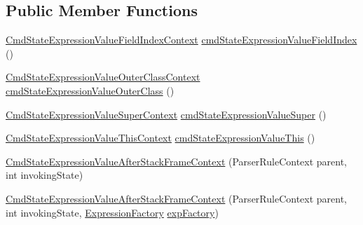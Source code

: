 \subsection*{Public Member Functions}
\begin{DoxyCompactItemize}
\item 
\hyperlink{classgov_1_1nasa_1_1jpf_1_1inspector_1_1server_1_1expression_1_1parser_1_1_expression_grammar_pa31d705710a4d9acddfdd67c37ac04c8a}{Cmd\+State\+Expression\+Value\+Field\+Index\+Context} \hyperlink{classgov_1_1nasa_1_1jpf_1_1inspector_1_1server_1_1expression_1_1parser_1_1_expression_grammar_pa89116a9ed8dad2a185081bb1175595f7_a6fb01dad45076170a7a324dc9d04ac2c}{cmd\+State\+Expression\+Value\+Field\+Index} ()
\item 
\hyperlink{classgov_1_1nasa_1_1jpf_1_1inspector_1_1server_1_1expression_1_1parser_1_1_expression_grammar_paa97aac802c11881ff9166c765f4fc61a}{Cmd\+State\+Expression\+Value\+Outer\+Class\+Context} \hyperlink{classgov_1_1nasa_1_1jpf_1_1inspector_1_1server_1_1expression_1_1parser_1_1_expression_grammar_pa89116a9ed8dad2a185081bb1175595f7_a0d332db4fc94bf762c9e8b290aa622e8}{cmd\+State\+Expression\+Value\+Outer\+Class} ()
\item 
\hyperlink{classgov_1_1nasa_1_1jpf_1_1inspector_1_1server_1_1expression_1_1parser_1_1_expression_grammar_pa66c003646cac4c60d53e10c6587465ef}{Cmd\+State\+Expression\+Value\+Super\+Context} \hyperlink{classgov_1_1nasa_1_1jpf_1_1inspector_1_1server_1_1expression_1_1parser_1_1_expression_grammar_pa89116a9ed8dad2a185081bb1175595f7_a90048ce6d26a1c6f31cd873b658d9d51}{cmd\+State\+Expression\+Value\+Super} ()
\item 
\hyperlink{classgov_1_1nasa_1_1jpf_1_1inspector_1_1server_1_1expression_1_1parser_1_1_expression_grammar_pa5c670e8752735864512a29116a6ade67}{Cmd\+State\+Expression\+Value\+This\+Context} \hyperlink{classgov_1_1nasa_1_1jpf_1_1inspector_1_1server_1_1expression_1_1parser_1_1_expression_grammar_pa89116a9ed8dad2a185081bb1175595f7_aac008f0240c6ed94936e8afd5c70b337}{cmd\+State\+Expression\+Value\+This} ()
\item 
\hyperlink{classgov_1_1nasa_1_1jpf_1_1inspector_1_1server_1_1expression_1_1parser_1_1_expression_grammar_pa89116a9ed8dad2a185081bb1175595f7_a17e394eff91fb44975d696eb09b1cc80}{Cmd\+State\+Expression\+Value\+After\+Stack\+Frame\+Context} (Parser\+Rule\+Context parent, int invoking\+State)
\item 
\hyperlink{classgov_1_1nasa_1_1jpf_1_1inspector_1_1server_1_1expression_1_1parser_1_1_expression_grammar_pa89116a9ed8dad2a185081bb1175595f7_a991617493155a689a9939848e3c95a59}{Cmd\+State\+Expression\+Value\+After\+Stack\+Frame\+Context} (Parser\+Rule\+Context parent, int invoking\+State, \hyperlink{classgov_1_1nasa_1_1jpf_1_1inspector_1_1server_1_1expression_1_1_expression_factory}{Expression\+Factory} \hyperlink{classgov_1_1nasa_1_1jpf_1_1inspector_1_1server_1_1expression_1_1parser_1_1_expression_grammar_pa89116a9ed8dad2a185081bb1175595f7_af5f64686b23dd22157ef756b0b17df89}{exp\+Factory})

\end{DoxyCompactItemize}
